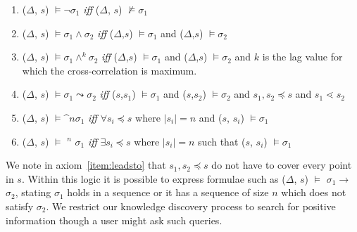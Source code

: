 \begin{enumerate}


\item ($\Delta$, $s$) $\models \neg  \sigma_1$ {
\em iff } ($\Delta$, $s$) $\not\models \sigma_1$ 



\item ($\Delta$, $s$) $\models \sigma_1 \wedge \sigma_2$ { \em iff }
($\Delta$,$s$) 
$\models \sigma_1$ and ($\Delta$,$s$) $\models \sigma_2$ 



\item ($\Delta$, $s$) $\models \sigma_1 \wedge^k \sigma_2$ { \em iff }
($\Delta$,$s$) 
$\models \sigma_1$ and ($\Delta$,$s$) $\models \sigma_2$ and $k$ is
the lag value for which the cross-correlation is maximum.


\item\label{item:leadsto} ($\Delta$, $s$) $\models \sigma_1 \leadsto \sigma_2$ { \em iff } ($s$,$s_1$)
$\models \sigma_1$ and ($s$,$s_2$) $\models \sigma_2$ and $s_1,s_2 \preceq 
s$ and $s_1 \lessdot s_2$




\item\label{item:fixed} ($\Delta$, $s$) $\models \bm^n \sigma_1$ { \em
iff }
$\forall s_i \preceq  s$ where $\mid s_i \mid = n$ and ($s$, $s_i$) $\models \sigma_1$




\item\label{item:guarantee} ($\Delta$, $s$) $\models$ \diam$^n$
$\sigma_1$ { \em iff }
$\exists s_i \preceq s$ where $\mid s_i \mid = n$ such that ($s$,
$s_i$) $\models \sigma_1$

\end{enumerate}

We note in axiom~\ref{item:leadsto} that $s_1,s_2 \preceq 
s$ do not have to cover every point in $s$.
Within this logic it is possible to express formulae such as
($\Delta$, $s$) $\models$ $\sigma_1
\to$  $\sigma_2$, stating $\sigma_1$ holds in a sequence or
it has a sequence of size $n$ which does not satisfy
$\sigma_2$. We restrict our knowledge discovery process to
search for positive information though a user might ask such queries.


